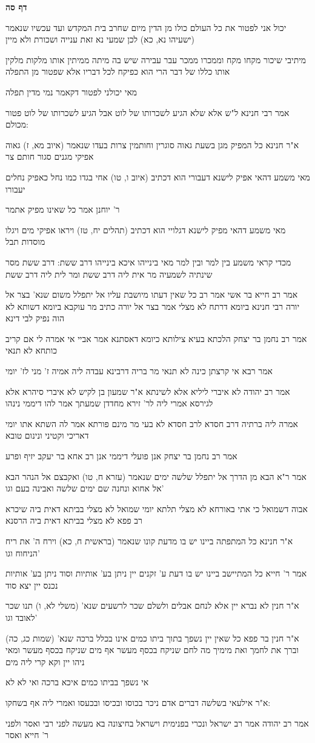\documentclass[12pt, openany]{book}
\newcommand{\sethebfont}{
\fontsize{10.5pt}{21.0pt} \selectfont
}
\newcommand{\textblock}[1]{
{\sethebfont #1\\}	
}
\newcommand{\sectname}{}
\newcommand{\newsection}[1]{
	\addcontentsline{toc}{section}{#1}
	\renewcommand{\sectname}{#1}	
	\vspace{-\baselineskip}
	\begin{center}
		\textbf{%
\fontsize{16pt}{16pt}\selectfont
			#1}
	\end{center}
	\vspace{-\baselineskip}
	\nopagebreak
}
\begin{document}
\newsection{דף סה}
\textblock{יכול אני לפטור את כל העולם כולו מן הדין מיום שחרב בית המקדש ועד עכשיו שנאמר (ישעיהו נא, כא) לכן שמעי נא זאת ענייה ושכורת ולא מיין}
\textblock{מיתיבי שיכור מקחו מקח וממכרו ממכר עבר עבירה שיש בה מיתה ממיתין אותו מלקות מלקין אותו כללו של דבר הרי הוא כפיקח לכל דבריו אלא שפטור מן התפלה}
\textblock{מאי יכולני לפטור דקאמר נמי מדין תפלה}
\textblock{אמר רבי חנינא ל"ש אלא שלא הגיע לשכרותו של לוט אבל הגיע לשכרותו של לוט פטור מכולם:}
\textblock{א"ר חנינא כל המפיק מגן בשעת גאוה סוגרין וחותמין צרות בעדו שנאמר (איוב מא, ז) גאוה אפיקי מגנים סגור חותם צר}
\textblock{מאי משמע דהאי אפיק לישנא דעבורי הוא דכתיב (איוב ו, טו) אחי בגדו כמו נחל כאפיק נחלים יעבורו}
\textblock{ר' יוחנן אמר כל שאינו מפיק אתמר}
\textblock{מאי משמע דהאי מפיק לישנא דגלויי הוא דכתיב (תהלים יח, טז) ויראו אפיקי מים ויגלו מוסדות תבל}
\textblock{מכדי קראי משמע בין למר ובין למר מאי בינייהו איכא בינייהו דרב ששת: דרב ששת מסר שינתיה לשמעיה מר אית ליה דרב ששת ומר לית ליה דרב ששת}
\textblock{אמר רב חייא בר אשי אמר רב כל שאין דעתו מיושבת עליו אל יתפלל משום שנא' בצר אל יורה רבי חנינא ביומא דרתח לא מצלי אמר בצר אל יורה כתיב מר עוקבא ביומא דשותא לא הוה נפיק לבי דינא}
\textblock{אמר רב נחמן בר יצחק הלכתא בעיא צילותא כיומא דאסתנא אמר אביי אי אמרה לי אם קריב כותחא לא תנאי}
\textblock{אמר רבא אי קרצתן כינה לא תנאי מר בריה דרבינא עבדה ליה אמיה ז' מני לז' יומי}
\textblock{אמר רב יהודה לא איברי ליליא אלא לשינתא א"ר שמעון בן לקיש לא איברי סיהרא אלא לגירסא אמרי ליה לר' זירא מחדדן שמעתך אמר להו דיממי נינהו}
\textblock{אמרה ליה ברתיה דרב חסדא לרב חסדא לא בעי מר מינם פורתא אמר לה השתא אתו יומי דאריכי וקטיני ונינום טובא}
\textblock{אמר רב נחמן בר יצחק אנן פועלי דיממי אנן רב אחא בר יעקב יזיף ופרע}
\textblock{אמר ר"א הבא מן הדרך אל יתפלל שלשה ימים שנאמר (עזרא ח, טו) ואקבצם אל הנהר הבא אל אחוא ונחנה שם ימים שלשה ואבינה בעם וגו'}
\textblock{אבוה דשמואל כי אתי באורחא לא מצלי תלתא יומי שמואל לא מצלי בביתא דאית ביה שיכרא רב פפא לא מצלי בביתא דאית ביה הרסנא}
\textblock{א"ר חנינא כל המתפתה ביינו יש בו מדעת קונו שנאמר (בראשית ח, כא) וירח ה' את ריח הניחוח וגו'}
\textblock{אמר ר' חייא כל המתיישב ביינו יש בו דעת ע' זקנים יין ניתן בע' אותיות וסוד ניתן בע' אותיות נכנס יין יצא סוד}
\textblock{א"ר חנין לא נברא יין אלא לנחם אבלים ולשלם שכר לרשעים שנא' (משלי לא, ו) תנו שכר לאובד וגו'}
\textblock{א"ר חנין בר פפא כל שאין יין נשפך בתוך ביתו כמים אינו בכלל ברכה שנא' (שמות כג, כה) וברך את לחמך ואת מימיך מה לחם שניקח בכסף מעשר אף מים שניקח בכסף מעשר ומאי ניהו יין וקא קרי ליה מים}
\textblock{אי נשפך בביתו כמים איכא ברכה ואי לא לא}
\textblock{א"ר אילעאי בשלשה דברים אדם ניכר בכוסו ובכיסו ובכעסו ואמרי ליה אף בשחקו:}
\textblock{אמר רב יהודה אמר רב ישראל ונכרי בפנימית וישראל בחיצונה בא מעשה לפני רבי ואסר ולפני ר' חייא ואסר}
\end{document}
